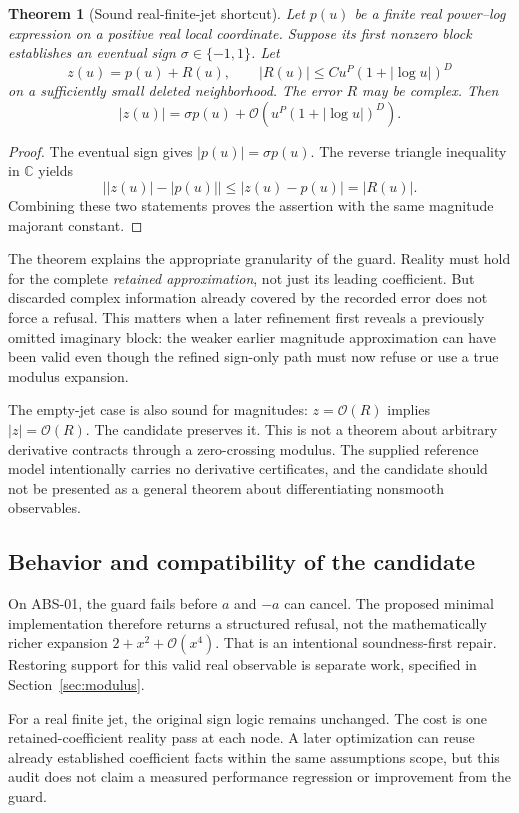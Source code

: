 \documentclass[11pt]{article}
\newcommand{\code}[1]{\texttt{\detokenize{#1}}}
\newcommand{\OO}{\mathcal O}
\newtheorem{theorem}{Theorem}[section]
\theoremstyle{remark}\newtheorem{remark}[theorem]{Remark}
\begin{document}
\begin{theorem}[Sound real-finite-jet shortcut]\label{thm:realguard}
Let \(p(u)\) be a finite real power--log expression on a positive real local
coordinate. Suppose its first nonzero block establishes an eventual sign
\(\sigma\in\{-1,1\}\). Let
\[
 z(u)=p(u)+R(u),\qquad
 |R(u)|\le C u^P(1+|\log u|)^D
\]
on a sufficiently small deleted neighborhood. The error \(R\) may be complex.
Then
\[
 |z(u)|=\sigma p(u)+\OO\!\left(u^P(1+|\log u|)^D\right).
\]
\end{theorem}
\begin{proof}
The eventual sign gives \(|p(u)|=\sigma p(u)\). The reverse triangle inequality
in \(\mathbb C\) yields
\[
 \bigl||z(u)|-|p(u)|\bigr|\le|z(u)-p(u)|=|R(u)|.
\]
Combining these two statements proves the assertion with the same magnitude
majorant constant.
\end{proof}

The theorem explains the appropriate granularity of the guard. Reality must
hold for the complete \emph{retained approximation}, not just its leading
coefficient. But discarded complex information already covered by the
recorded error does not force a refusal. This matters when a later refinement
first reveals a previously omitted imaginary block: the weaker earlier
magnitude approximation can have been valid even though the refined sign-only
path must now refuse or use a true modulus expansion.

The empty-jet case is also sound for magnitudes: \(z=\OO(R)\) implies
\(|z|=\OO(R)\). The candidate preserves it. This is not a theorem about
arbitrary derivative contracts through a zero-crossing modulus. The supplied
reference model intentionally carries no derivative certificates, and the
candidate should not be presented as a general theorem about differentiating
nonsmooth observables.

\subsection{Behavior and compatibility of the candidate}
On ABS-01, the guard fails before \(a\) and \(-a\) can cancel. The proposed
minimal implementation therefore returns a structured refusal, not the
mathematically richer expansion \(2+x^2+\OO(x^4)\). That is an intentional
soundness-first repair. Restoring support for this valid real observable is
separate work, specified in Section~\ref{sec:modulus}.

For a real finite jet, the original sign logic remains unchanged. The cost is
one retained-coefficient reality pass at each \code{Abs} node. A later optimization
can reuse already established coefficient facts within the same assumptions
scope, but this audit does not claim a measured performance regression or
improvement from the guard.
\end{document}

